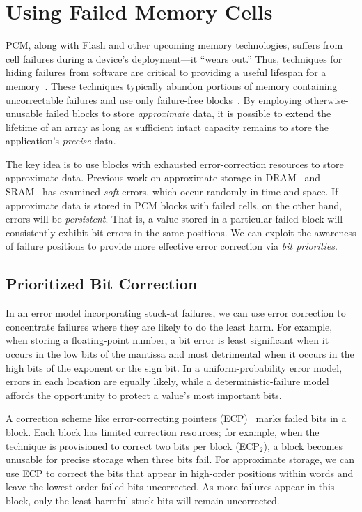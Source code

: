 \section{Using Failed Memory Cells}
\label{approxstorage:sec:recycling}

PCM, along with Flash and other upcoming memory technologies, suffers from cell
failures during a device's deployment---it ``wears out.'' Thus, techniques for hiding failures from
software are critical to providing a useful lifespan for a
memory~\cite{pcm-dram-alt}.
These techniques typically abandon portions of memory containing
uncorrectable failures and use only failure-free blocks~\cite{ecp,payg,safer}.
By employing otherwise-unusable failed blocks to
store \emph{approximate} data, it is possible to extend the
lifetime of an array as long as sufficient intact capacity remains to
store the application's \emph{precise} data.

The key idea is to use blocks with exhausted
error-correction resources to store approximate data. Previous work on
approximate storage in DRAM~\cite{flikker} and SRAM~\cite{truffle} has examined
\emph{soft} errors, which occur randomly in time and space.
If approximate data is stored in PCM blocks with failed cells, on the other
hand, errors will be
\emph{persistent}. That is, a value stored in a particular failed
block will consistently exhibit bit errors in the same positions.
We can
exploit the awareness of failure positions to provide more effective
error correction via \emph{bit priorities}.

\subsection{Prioritized Bit Correction}
\label{approxstorage:sec:bitprior}

In an error model incorporating
stuck-at failures, we can use error correction to concentrate
failures
where they are likely to do the least harm. For example, when storing
a floating-point number, a bit error is least significant when it
occurs in the low bits of the mantissa and most detrimental when it
occurs in the high bits of the exponent or the sign bit. In a uniform-probability
error model, errors in each location are equally likely, while a
deterministic-failure model affords the opportunity to protect
a value's most important bits.

A correction scheme like error-correcting pointers (ECP)~\cite{ecp} marks failed bits in a
block. Each block has limited correction resources; for example,
when the technique is provisioned to correct two bits per block (ECP$_2$),
a block becomes unusable for precise storage when three
bits fail. For approximate storage, we
can use ECP to correct the bits that appear in high-order positions
within words and leave the lowest-order failed bits uncorrected. As
more failures appear in this block, only the least-harmful stuck bits will
remain uncorrected.

